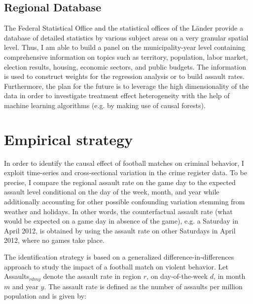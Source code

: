 \subsection{Regional Database}
The Federal Statistical Office and the statistical offices of the Länder provide a database of detailed statistics by various subject areas on a very granular spatial level. Thus, I am able to build a panel on the municipality-year level containing comprehensive information on topics such as territory, population, labor market, election results, housing, economic sectors, and public budgets. The information is used to construct weights for the regression analysis or to build assault rates. {\color{red}Furthermore, the plan for the future is to leverage the high dimensionality of the data in order to investigate treatment effect heterogeneity with the help of machine learning algorithms (e.g. by making use of causal forests).} 







\bigskip
\section{Empirical strategy}\label{sec_soc_ext:empirical_strategy}

In order to identify the causal effect of football matches on criminal behavior, I exploit time-series and cross-sectional variation in the crime register data. To be precise, I compare the regional assault rate on the game day to the expected assault level conditional on the day of the week, month, and year while additionally accounting for other possible confounding variation stemming from weather and holidays. In other words, the counterfactual assault rate (what would be expected on a game day in absence of the game), e.g. a Saturday in April 2012, is obtained by using the assault rate on other Saturdays in April 2012, where no games take place. %


The identification strategy is based on a generalized difference-in-differences approach to study the impact of a football match on violent behavior. Let Assaults$_{rdmy}$ denote the assault rate in region $r$, on day-of-the-week $d$, in month $m$ and year $y$. The assault rate is defined as the number of assaults per million population and is given by:

